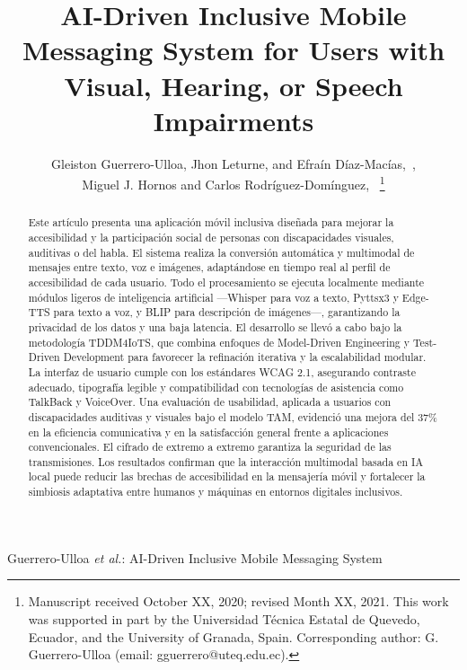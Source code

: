 \documentclass[lettersize,journal]{IEEEtran}
\begin{document}
    \title{AI-Driven Inclusive Mobile Messaging System for Users with Visual, Hearing, or Speech Impairments}
    
    \author{
        Gleiston Guerrero-Ulloa, Jhon Leturne, and Efraín Díaz-Macías,~,\\
        Miguel J. Hornos and Carlos Rodríguez-Domínguez,~
        \thanks{Manuscript received October XX, 2020; revised Month XX, 2021. This work was supported in part by the Universidad Técnica Estatal de Quevedo, Ecuador, and the University of Granada, Spain. Corresponding author: G. Guerrero-Ulloa (email: gguerrero@uteq.edu.ec).}
    }
    
    {Guerrero-Ulloa \MakeLowercase{\textit{et al.}}: AI-Driven Inclusive Mobile Messaging System}
    
    \maketitle
    
    \begin{abstract}
        Este artículo presenta una aplicación móvil inclusiva diseñada para mejorar la accesibilidad y la participación social de personas con discapacidades visuales, auditivas o del habla. El sistema realiza la conversión automática y multimodal de mensajes entre texto, voz e imágenes, adaptándose en tiempo real al perfil de accesibilidad de cada usuario. Todo el procesamiento se ejecuta localmente mediante módulos ligeros de inteligencia artificial —Whisper para voz a texto, Pyttsx3 y Edge-TTS para texto a voz, y BLIP para descripción de imágenes—, garantizando la privacidad de los datos y una baja latencia. El desarrollo se llevó a cabo bajo la metodología TDDM4IoTS, que combina enfoques de Model-Driven Engineering y Test-Driven Development para favorecer la refinación iterativa y la escalabilidad modular. La interfaz de usuario cumple con los estándares WCAG 2.1, asegurando contraste adecuado, tipografía legible y compatibilidad con tecnologías de asistencia como TalkBack y VoiceOver. Una evaluación de usabilidad, aplicada a usuarios con discapacidades auditivas y visuales bajo el modelo TAM, evidenció una mejora del 37\% en la eficiencia comunicativa y en la satisfacción general frente a aplicaciones convencionales. El cifrado de extremo a extremo garantiza la seguridad de las transmisiones. Los resultados confirman que la interacción multimodal basada en IA local puede reducir las brechas de accesibilidad en la mensajería móvil y fortalecer la simbiosis adaptativa entre humanos y máquinas en entornos digitales inclusivos.
    \end{abstract}
\end{document}
